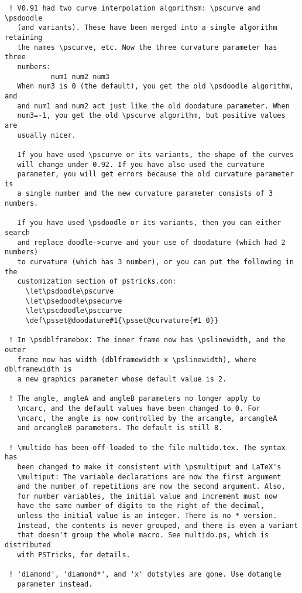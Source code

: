 \begin{Verbatim}
 ! V0.91 had two curve interpolation algorithsm: \pscurve and \psdoodle
   (and variants). These have been merged into a single algorithm retaining
   the names \pscurve, etc. Now the three curvature parameter has three
   numbers:
           num1 num2 num3
   When num3 is 0 (the default), you get the old \psdoodle algorithm, and
   and num1 and num2 act just like the old doodature parameter. When
   num3=-1, you get the old \pscurve algorithm, but positive values are
   usually nicer.

   If you have used \pscurve or its variants, the shape of the curves
   will change under 0.92. If you have also used the curvature
   parameter, you will get errors because the old curvature parameter is
   a single number and the new curvature parameter consists of 3 numbers.

   If you have used \psdoodle or its variants, then you can either search
   and replace doodle->curve and your use of doodature (which had 2 numbers)
   to curvature (which has 3 number), or you can put the following in the
   customization section of pstricks.con:
     \let\psdoodle\pscurve
     \let\psedoodle\psecurve
     \let\pscdoodle\psccurve
     \def\psset@doodature#1{\psset@curvature{#1 0}}

 ! In \psdblframebox: The inner frame now has \pslinewidth, and the outer
   frame now has width (dblframewidth x \pslinewidth), where dblframewidth is
   a new graphics parameter whose default value is 2.

 ! The angle, angleA and angleB parameters no longer apply to
   \ncarc, and the default values have been changed to 0. For
   \ncarc, the angle is now controlled by the arcangle, arcangleA
   and arcangleB parameters. The default is still 8.

 ! \multido has been off-loaded to the file multido.tex. The syntax has
   been changed to make it consistent with \psmultiput and LaTeX's
   \multiput: The variable declarations are now the first argument
   and the number of repetitions are now the second argument. Also,
   for number variables, the initial value and increment must now
   have the same number of digits to the right of the decimal,
   unless the initial value is an integer. There is no * version.
   Instead, the contents is never grouped, and there is even a variant
   that doesn't group the whole macro. See multido.ps, which is distributed
   with PSTricks, for details.

 ! 'diamond', 'diamond*', and 'x' dotstyles are gone. Use dotangle
   parameter instead.
\end{Verbatim}

